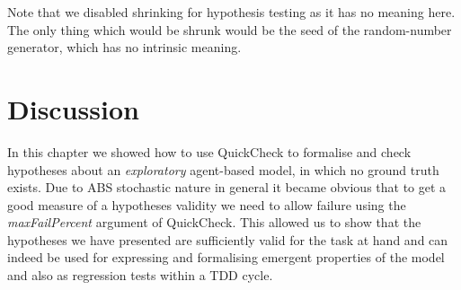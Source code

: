 Note that we disabled shrinking for hypothesis testing as it has no meaning here. The only thing which would be shrunk would be the seed of the random-number generator, which has no intrinsic meaning.

\section{Discussion}
In this chapter we showed how to use QuickCheck to formalise and check hypotheses about an \textit{exploratory} agent-based model, in which no ground truth exists. Due to ABS stochastic nature in general it became obvious that to get a good measure of a hypotheses validity we need to allow failure using the \textit{maxFailPercent} argument of QuickCheck. This allowed us to show that the hypotheses we have presented are sufficiently valid for the task at hand and can indeed be used for expressing and formalising emergent properties of the model and also as regression tests within a TDD cycle.